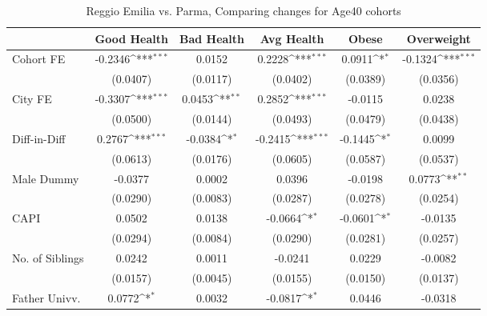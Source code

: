 \begin{table}[htbp]\centering
\def\sym#1{\ifmmode^{#1}\else\(^{#1}\)\fi}
\caption{Reggio Emilia vs. Parma, Comparing changes for Age40 cohorts}
\begin{tabular}{l*{5}{c}}
\toprule
            &\multicolumn{1}{c}{Good Health}&\multicolumn{1}{c}{Bad Health}&\multicolumn{1}{c}{Avg Health}&\multicolumn{1}{c}{Obese}&\multicolumn{1}{c}{Overweight}\\
\midrule
Cohort FE   &     -0.2346\sym{***}&      0.0152         &      0.2228\sym{***}&      0.0911\sym{*}  &     -0.1324\sym{***}\\
            &    (0.0407)         &    (0.0117)         &    (0.0402)         &    (0.0389)         &    (0.0356)         \\
\addlinespace
City FE     &     -0.3307\sym{***}&      0.0453\sym{**} &      0.2852\sym{***}&     -0.0115         &      0.0238         \\
            &    (0.0500)         &    (0.0144)         &    (0.0493)         &    (0.0479)         &    (0.0438)         \\
\addlinespace
Diff-in-Diff&      0.2767\sym{***}&     -0.0384\sym{*}  &     -0.2415\sym{***}&     -0.1445\sym{*}  &      0.0099         \\
            &    (0.0613)         &    (0.0176)         &    (0.0605)         &    (0.0587)         &    (0.0537)         \\
\addlinespace
Male Dummy  &     -0.0377         &      0.0002         &      0.0396         &     -0.0198         &      0.0773\sym{**} \\
            &    (0.0290)         &    (0.0083)         &    (0.0287)         &    (0.0278)         &    (0.0254)         \\
\addlinespace
CAPI        &      0.0502         &      0.0138         &     -0.0664\sym{*}  &     -0.0601\sym{*}  &     -0.0135         \\
            &    (0.0294)         &    (0.0084)         &    (0.0290)         &    (0.0281)         &    (0.0257)         \\
\addlinespace
No. of Siblings&      0.0242         &      0.0011         &     -0.0241         &      0.0229         &     -0.0082         \\
            &    (0.0157)         &    (0.0045)         &    (0.0155)         &    (0.0150)         &    (0.0137)         \\
\addlinespace
Father Univv.&      0.0772\sym{*}  &      0.0032         &     -0.0817\sym{*}  &      0.0446         &     -0.0318         \\

\end{tabular}
\end{table}
